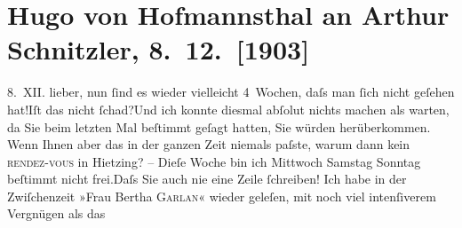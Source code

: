 

         
         \newcommand{\erwaehntePersonen}{Personen: }
         \newcommand{\erwaehnteInstitutionen}{}
         \newcommand{\erwaehnteOrte}{Orte: Rodaun, Wien, XIII., Hietzing}
         \newcommand{\erwaehnteWerke}{Werke: Das gerettete Venedig. Trauerspiel in fünf Aufzügen, Der einsame Weg. Schauspiel in fünf Akten, Die Frau des Weisen. Novelletten, Elektra. Tragödie in einem Aufzug, Frau Bertha Garlan. Roman, Sterben. Novelle}
               \section[Hugo von Hofmannsthal an Arthur Schnitzler, 8. 12. {[}1903{]}]{ Hugo von Hofmannsthal an Arthur Schnitzler, 8. 12. {[}1903{]}}\nopagebreak{}\rehead{ }\begin{ledgroupsized}[t]{13cm}\normalsize\beginnumbering \toendnotes[C]{\smallbreak\pagebreak[2]} 
\toendnotes[C]{\smallbreak}\pstart
           \raggedleft{}{\pb}8. XII.\pend
           \pstart{}lieber,\pend\pstart
           nun ſind es wieder vielleicht 4 Wochen, daſs man ſich nicht geſehen hat!\hspace*{1em}Iſt das nicht ſchad?\hspace*{1.5em}Und ich konnte diesmal abſolut nichts machen als warten, da Sie beim letzten Mal
               beſtimmt geſagt hatten, Sie würden herüberkommen. Wenn Ihnen aber das in der ganzen
                  {\pb}Zeit niemals paſste, warum
               dann kein \textsc{rendez-vous} in Hietzing? –\pend
           \pstart
           Dieſe Woche bin ich Mittwoch Samstag Sonntag beſtimmt nicht frei.\hspace*{1.5em}Daſs Sie auch nie eine Zeile ſchreiben! \pend
           \pstart
           Ich habe in der Zwiſchenzeit »Frau Bertha \textsc{Garlan}« wieder geleſen, mit noch viel {\pb}intenſiverem Vergnügen als das

\end{ledgroupsized}
